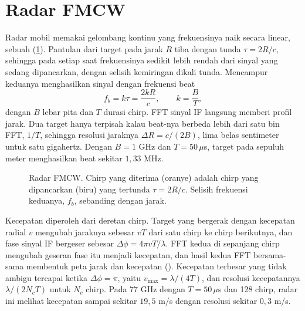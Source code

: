 \section{Radar FMCW}

Radar mobil memakai gelombang kontinu yang frekuensinya naik secara linear, sebuah 
(\cref{fig:fmcw}). Pantulan dari target pada jarak $R$ tiba dengan tunda $\tau=2R/c$, sehingga pada setiap saat
frekuensinya sedikit lebih rendah dari sinyal yang sedang dipancarkan, dengan selisih kemiringan dikali tunda.
Mencampur keduanya menghasilkan sinyal  dengan frekuensi beat
\begin{equation}
f_b=k\tau=\frac{2kR}{c},\qquad k=\frac BT,
\end{equation}
dengan $B$ lebar pita dan $T$ durasi chirp. FFT sinyal IF langsung memberi profil jarak. Dua target hanya
terpisah kalau beat-nya berbeda lebih dari satu bin FFT, $1/T$, sehingga resolusi jaraknya
$\Delta R=c/(2B)$, lima belas sentimeter untuk satu gigahertz. Dengan $B=1$ GHz dan $T=50\,\mu$s, target
pada sepuluh meter menghasilkan beat sekitar $1{,}33$ MHz.

\begin{figure}[ht]
\centering
{}
\caption{Radar FMCW. Chirp yang diterima (oranye) adalah chirp yang dipancarkan (biru) yang tertunda $\tau=2R/c$.
Selisih frekuensi keduanya, $f_b$, sebanding dengan jarak.}
\label{fig:fmcw}
\end{figure}

Kecepatan diperoleh dari deretan chirp. Target yang bergerak dengan kecepatan radial $v$ mengubah jaraknya
sebesar $vT$ dari satu chirp ke chirp berikutnya, dan fase sinyal IF bergeser sebesar
$\Delta\phi=4\pi vT/\lambda$. FFT kedua di sepanjang chirp mengubah geseran fase itu menjadi kecepatan, dan
hasil kedua FFT bersama-sama membentuk peta jarak dan kecepatan (). Kecepatan
terbesar yang tidak ambigu tercapai ketika $\Delta\phi=\pi$, yaitu $v_{\max}=\lambda/(4T)$, dan resolusi
kecepatannya $\lambda/(2N_cT)$ untuk $N_c$ chirp. Pada 77 GHz dengan $T=50\,\mu$s dan 128 chirp, radar ini
melihat kecepatan sampai sekitar $19{,}5$ m/s dengan resolusi sekitar $0{,}3$ m/s.


